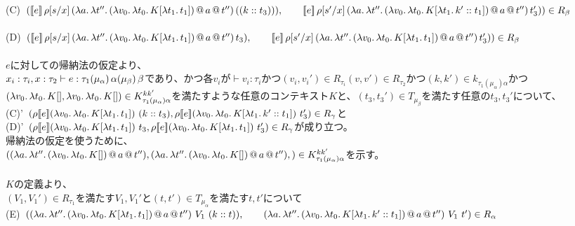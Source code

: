 \documentclass[japanese,draft]{jssst_ppl} %
\begin{document}
(C)\ $(\CPS{e}{\rho[\Change{x}{s}]}
           {\LamP{a}{\Lam{t''}
               {\App{\App{\LamP{v_0}{\Lam{t_0}{K[\Lam{t_1}{t_1}]}}}{a}}{t''}}}}{(\ConsP{k}{t_3})}),\\
  \qquad \CPS{e}{\rho[\Change{x}{s'}]}
           {\LamP{a}{\Lam{t''}
               {\App{\App{\LamP{v_0}{\Lam{t_0}{K[\Lam{t_1}{\Cons{k'}{t_1}}]}}}{a}}{t''}}}}{t_3'}))\in R_{\beta}$\\
\\
(D)\ $(\CPS{e}{\rho[\Change{x}{s}]}
           {\LamP{a}{\Lam{t''}
               {\App{\App{\LamP{v_0}{\Lam{t_0}{K[\Lam{t_1}{t_1}]}}}{a}}{t''}}}}{t_3}),\\
  \qquad \CPS{e}{\rho[\Change{x}{s'}]}
           {\LamP{a}{\Lam{t''}
               {\App{\App{\LamP{v_0}{\Lam{t_0}{K[\Lam{t_1}{t_1}]}}}{a}}{t''}}}}{t_3'}))\in R_{\beta}$\\
\\
$e$に対しての帰納法の仮定より、\\
$x_i:\tau_i, x:\tau_2 \vdash e:\tau_1 \TrailType{\alpha} \TrailType{\beta}$であり、かつ各$v_i$が$\vdash v_i:\tau_i$かつ$(v_i,v_i') \in R_{\tau_i} (v, v')\in R_{\tau_2}$かつ$(k,k')\in k_{\tau_1(\mu_{\alpha})\alpha}$かつ$(\Lam{v_0}{\Lam{t_0}{K[]}}, \Lam{v_0}{\Lam{t_0}{K[]}})\in  K^{kk'}_{\tau_1(\mu_{\alpha})\alpha}$を満たすような任意のコンテキスト$K$と、$(t_3, t_3') \in T_{\mu_{\beta}}$を満たす任意の$t_3, t_3'$について、\\
(C)'\ $(\rho \CPSTh{e} \LamP{v_0}{\Lam{t_0}{K[\Lam{t_1}{t_1}]}}\ \ConsP{k}{t_3}, \rho \CPSTh{e} \LamP{v_0}{\Lam{t_0}{K[\Lam{t_1}{\Cons{k'}{t_1}}]}}\ t_3')\in R_{\gamma}$と\\
(D)'\ $(\rho \CPSTh{e} \LamP{v_0}{\Lam{t_0}{K[\Lam{t_1}{t_1}]}}\ t_3, \rho \CPSTh{e} \LamP{v_0}{\Lam{t_0}{K[\Lam{t_1}{t_1}]}}\ t_3')\in R_{\gamma}$が成り立つ。\\
帰納法の仮定を使うために、\\
$(\LamP{a}{\Lam{t''}
  {\App{\App{\LamP{v_0}{\Lam{t_0}{K[]}}}{a}}{t''}}},
  \LamP{a}{\Lam{t''}
    {\App{\App{\LamP{v_0}{\Lam{t_0}{K[]}}}{a}}{t''}}},)\in K^{kk'}_{\tau_1(\mu_{\alpha})\alpha}$を示す。\\
  \\
  $K$の定義より、\\
  $(V_1, V_1')\in R_{\tau_1}$を満たす$V_1,V_1'$と$(t,t')\in T_{\mu_{\alpha}}$を満たす$t,t'$について\\
  (E)\ $(\LamP{a}{\Lam{t''}{\App{\App{\LamP{v_0}{\Lam{t_0}{K[\Lam{t_1}{t_1}]}}}{a}}{t''}}}\ V_1\ (\Cons{k}{t})),\\
  \qquad \LamP{a}{\Lam{t''}{\App{\App{\LamP{v_0}{\Lam{t_0}{K[\Lam{t_1}{\Cons{k'}{t_1}}]}}}{a}}{t''}}}\ V_1\ t')\in R_{\alpha}$\\
\end{document}

